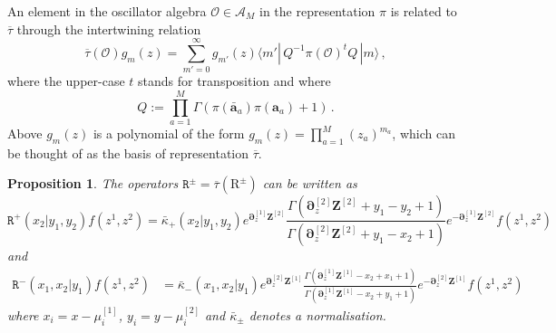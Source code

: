 \documentclass[11pt]{article}
\numberwithin{equation}{section}
\newtheorem{proposition}[theorem]{Proposition}
\newcommand{\oa}{\mathbf{a}}
\newcommand{\oad}{\mathbf{\bar{a}}}
\newcommand{\M}{M}
\newcommand{\OT}{\bm{\partial}_z}
\newcommand{\OTD}{\bm{Z}}
\newcommand{\abrOSCR}{\mathrm{R}}
\newcommand{\ecdR}{\mathtt{R}}
\newcommand{\heat}{z}
\newcommand{\dualrep}{\overline{\tau}}
\begin{document}
 An element  in the oscillator algebra $\mathcal{O}\in\mathcal{A}_M$ in the representation $\pi$ is related to $\dualrep $ through the intertwining relation
   \begin{equation}\label{intertw-dual}
\dualrep (\mathcal{O} )g_{m}(\heat)=\sum_{m'=0}^\infty g_{m'}(\heat)\langle m'| \,Q^{-1}\pi(\mathcal{O} )^{t}Q \,|m\rangle  \,,
 \end{equation}
 where the upper-case $t$ stands for transposition and where 
 \begin{equation}\label{Q-matrix}
 Q:=\prod_{a=1}^{\M}\Gamma(\pi(\oad_{a})\pi(\oa_{a})+1)\,.
 \end{equation}
 Above $g_{m}(\heat)$ is a polynomial of the form $g_{m}(\heat)=\prod_{a=1}^{\M}(\heat_a)^{m_a}$, which can be thought of as the basis of representation $\dualrep $. 
\begin{proposition}
     The operators $\ecdR ^\pm=\dualrep (\abrOSCR^\pm)$ can be written as
\begin{equation}\label{Rp-continuous2}
			\ecdR ^+(x_2|y_1,y_2)f(\heat^{1},\heat^{2}) =\bar\kappa_+(x_2|y_1,y_2)e^{\OT^{[1]}\OTD^{[2]}}\frac{\Gamma(\OT^{[2]}\OTD^{[2]}+y_1-y_2+1)}{\Gamma(\OT^{[2]}\OTD^{[2]}+y_1-x_2+1)}e^{-\OT^{[1]}\OTD^{[2]}}f(\heat^{1},\heat^{2})
		\end{equation}
        and
    \begin{equation}\label{Rm-continuous2}
		\begin{split}
\ecdR ^{-}(x_{1},x_{2}|y_{1})f(\heat^{1},\heat^{2}
)&=\bar \kappa_-(x_{1},x_2|y_{1})e^{\OT^{[2]}\OTD^{[1]}}\frac{\Gamma\left(\OT^{[1]}\OTD^{[1]}-x_{2}+x_{1}+1\right)}{\Gamma\left(\OT^{[1]}\OTD^{[1]}-x_{2}+y_{1}+1\right)}e^{-\OT^{[2]}\OTD^{[1]}}f(\heat^{1},\heat^{2})
		\end{split}
	\end{equation}
where  $x_i=x-\mu_i^{[1]}$, $y_i=y-\mu_i^{[2]}$ and    $\bar \kappa_\pm$ denotes a normalisation.
\end{proposition}
\end{document}
